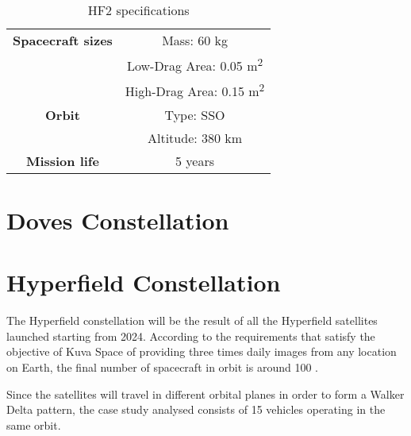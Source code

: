 \begin{table}[h]
    \centering
    \begin{tabular}{ |c|c| } %
        \hline
        \textbf{Spacecraft sizes} & Mass: 60 kg \\  
                                  & Low-Drag Area: 0.05 m\textsuperscript{2} \\ 
                                  & High-Drag Area: 0.15 m\textsuperscript{2} \\ \hline
        \textbf{Orbit}            & Type: SSO \\ 
                                  & Altitude: 380 km \\ \hline
        \textbf{Mission life}     & 5 years \\ \hline
    \end{tabular}
\caption{HF2 specifications}
\label{hf2_specs_tab}
\end{table}



\section{Doves Constellation} \label{planet_constellation_par}



\section{Hyperfield Constellation} \label{kuva_constellation_par}
The Hyperfield constellation will be the result of all the Hyperfield satellites launched starting from 2024.
According to the requirements that satisfy the objective of Kuva Space of providing three times daily images from any location on Earth, the final number of spacecraft in orbit is around 100 \cite{tikka2023hyperfield}.

Since the satellites will travel in different orbital planes in order to form a Walker Delta pattern, the case study analysed consists of 15 vehicles operating in the same orbit.
